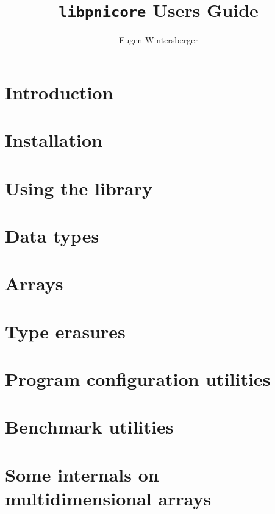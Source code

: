 \documentclass[a4paper,draft]{scrbook}
\title{{\Huge{\tt libpnicore} Users Guide}}
\author{Eugen Wintersberger}
\begin{document}
\maketitle
\tableofcontents
\listoffixmes

\chapter{Introduction}\label{chapter:introduction}

\FloatBarrier

\chapter{Installation}\label{chapter:installation}

\FloatBarrier

\chapter{Using the library}\label{chapter:using_library}

\FloatBarrier 

\chapter{Data types}\label{chapter:data_types}

\FloatBarrier

\chapter{Arrays}\label{chapter:arrays}

\FloatBarrier

\chapter{Type erasures}\label{chapter:type_erasures}

\FloatBarrier

\chapter{Program configuration utilities}\label{chapter:configuration}

\FloatBarrier

\chapter{Benchmark utilities}\label{chapter:benchmark}
\FloatBarrier

\appendix
\chapter{Some internals on multidimensional arrays}

\FloatBarrier


\end{document}
